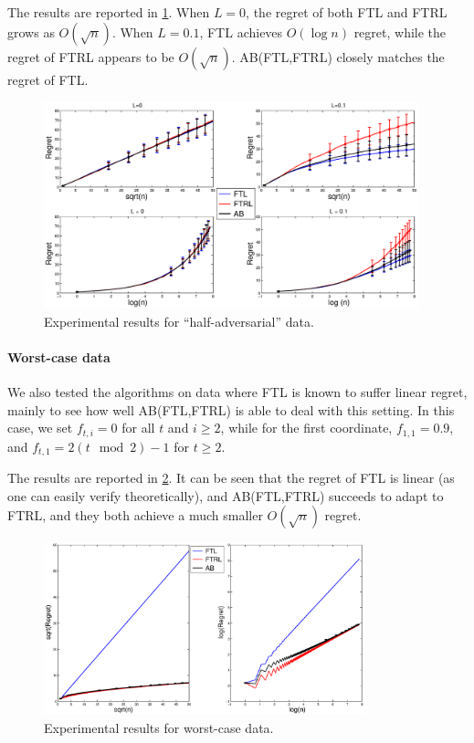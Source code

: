 The results are reported in \cref{res:adver}.
When $L=0$,  the regret of both FTL and FTRL grows as $O(\sqrt{n})$. 
When $L=0.1$, FTL achieves $O(\log n)$ regret,
while the regret of FTRL appears to be $O(\sqrt{n})$. 
AB(FTL,FTRL) closely matches the regret of FTL.

\begin{figure}[th]
	\centering
	\includegraphics[height = 6cm]{figures/ExpResults/Adve}
	\caption{Experimental results for ``half-adversarial'' data. \label{res:adver}}
\end{figure}


\paragraph{Worst-case data}
We also tested the algorithms on data where FTL is known to suffer linear regret, mainly to see how well AB(FTL,FTRL) is able to deal with this setting.
In this case, we set $f_{t,i}=0$ for all $t$ and $i\ge 2$, while 
for the first coordinate, $f_{1,1} = 0.9$, and $f_{t,1} = 2(t \mod 2) - 1$ for $t \ge 2$.

The results are reported in \cref{res:worst_case}. It can be seen that the regret of FTL is linear (as one can easily verify theoretically), and 
AB(FTL,FTRL) succeeds to adapt to FTRL, and they both achieve a much smaller $O(\sqrt{n})$ regret. 

\begin{figure}[th]
	\centering
	\includegraphics[height = 5cm]{figures/ExpResults/WorstCase}	
	\caption{Experimental results for worst-case data. \label{res:worst_case}}
\end{figure}
